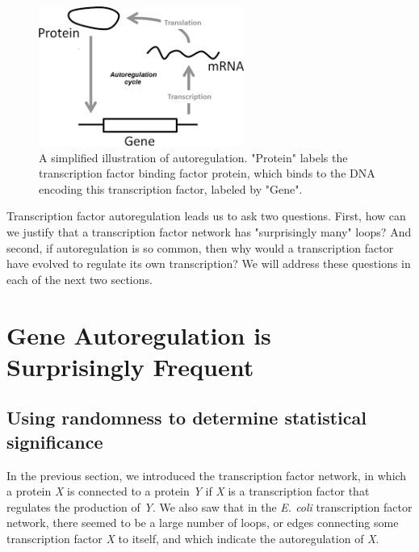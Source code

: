 \begin{figure}[h]
\centering
\mySfFamily
\includegraphics[width = 0.6\textwidth]{../assets/images/600px/autoregulation_example.png}
\caption{A simplified illustration of autoregulation. "Protein" labels the transcription factor binding factor protein, which binds to the DNA encoding this transcription factor, labeled by "Gene".}
\label{fig:autoregulation_example}
\end{figure}

Transcription factor autoregulation leads us to ask two questions. First, how can we justify that a transcription factor network has "surprisingly many" loops? And second, if autoregulation is so common, then why would a transcription factor have evolved to regulate its own transcription? We will address these questions in each of the next two sections.


\FloatBarrier
{}

\section{Gene Autoregulation is Surprisingly Frequent}
\label{sec:gene_autoregulation_is_surprisingly_frequent}

\subsection{Using randomness to determine statistical significance}

In the previous section, we introduced the transcription factor network, in which a protein \textit{X} is connected to a protein \textit{Y} if \textit{X} is a transcription factor that regulates the production of \textit{Y}. We also saw that in the \textit{E. coli} transcription factor network, there seemed to be a large number of loops, or edges connecting some transcription factor \textit{X} to itself, and which indicate the autoregulation of \textit{X}.

